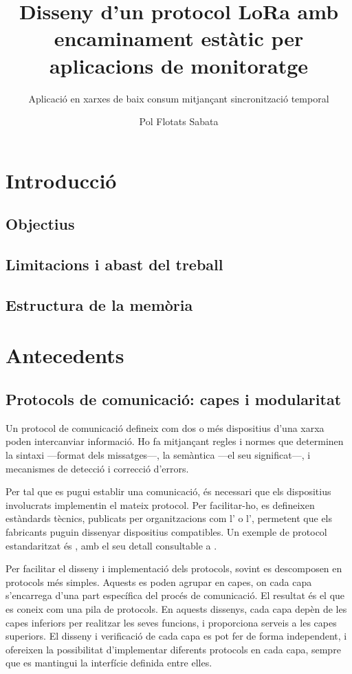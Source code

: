 \documentclass{tfgitic}[2024/07/01]
\title{Disseny d’un protocol LoRa amb encaminament estàtic per aplicacions de monitoratge}
\subtitle{Aplicació en xarxes de baix consum mitjançant sincronització temporal}
\author{Pol Flotats Sabata}
\begin{document}

\chapter{Introducció}
\section{Objectius}
\section{Limitacions i abast del treball}
\section{Estructura de la memòria}

\chapter{Antecedents}
\section{Protocols de comunicació: capes i modularitat}
\label{sec:protocols}
Un protocol de comunicació defineix com dos o més dispositius d'una xarxa poden intercanviar informació. Ho fa mitjançant regles i normes que determinen la sintaxi ---format dels missatges---, la semàntica ---el seu significat---, i mecanismes de detecció i correcció d'errors.

Per tal que es pugui establir una comunicació, és necessari que els dispositius involucrats implementin el mateix protocol. Per facilitar-ho, es defineixen estàndards tècnics, publicats per organitzacions com l' o l', permetent que els fabricants puguin dissenyar dispositius compatibles. Un exemple de protocol estandaritzat és , amb el seu detall consultable a \cite{fielding_hypertext_2014}.

Per facilitar el disseny i implementació dels protocols, sovint es descomposen en protocols més simples. Aquests es poden agrupar en capes, on cada capa s'encarrega d'una part específica del procés de comunicació. El resultat és el que es coneix com una pila de protocols. 
En aquests dissenys, cada capa depèn de les capes inferiors per realitzar les seves funcions, i proporciona serveis a les capes superiors. El disseny i verificació de cada capa es pot fer de forma independent, i ofereixen la possibilitat d'implementar diferents protocols en cada capa, sempre que es mantingui la interfície definida entre elles.
\end{document}
